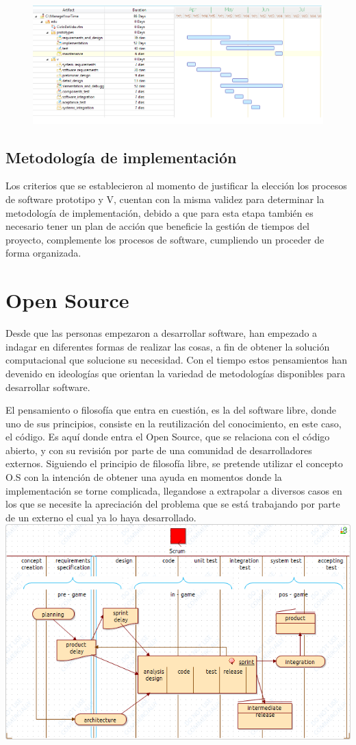 \begin{figure}
	\centering
	\includegraphics[width=0.7\linewidth]{proyecto/metodologia/imgs/Gantt}
	\caption{}
	\label{fig:gantt}
\end{figure}
\subsection{Metodología de implementación}
Los criterios que se establecieron al momento de justificar la elección los procesos de software prototipo y V, cuentan con la misma validez para determinar la metodología de implementación, debido a que para esta etapa también es necesario tener un plan de acción que beneficie la gestión de tiempos del proyecto, complemente los procesos de software, cumpliendo un proceder de forma organizada.

\section{Open Source}
Desde que las personas empezaron a desarrollar software, han empezado a indagar en diferentes formas de realizar las cosas, a fin de obtener la solución computacional que solucione su necesidad. Con el tiempo estos pensamientos han devenido en ideologías que orientan la variedad de metodologías disponibles para desarrollar software.

El pensamiento o filosofía que entra en cuestión, es la del software libre, donde uno de sus principios, consiste en la reutilización del conocimiento, en este caso, el código. Es aquí donde entra el Open Source, que se relaciona con el código abierto, y con su revisión por parte de una comunidad de desarrolladores externos. Siguiendo el principio de filosofía libre, se pretende utilizar el concepto O.S con la intención de obtener una ayuda en momentos donde la implementación se torne complicada, llegandose a extrapolar a diversos casos en los que se necesite la apreciación del problema que se está trabajando por parte de un externo el cual ya lo haya desarrollado.
\includegraphics[width=0.7\linewidth]{proyecto/metodologia/imgs/Scrum}

%

